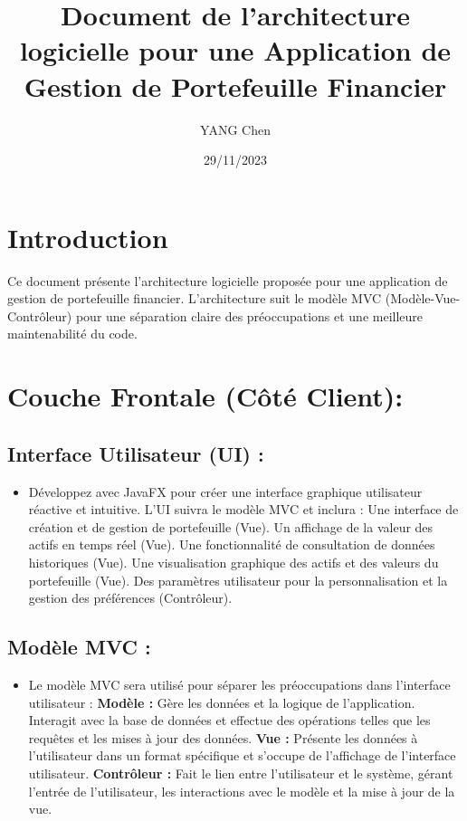 \documentclass{article}
\title{Document de l'architecture logicielle pour une Application de Gestion de Portefeuille Financier}
\date{29/11/2023}
\author{YANG Chen}
\begin{document}
\maketitle

\section{Introduction}
Ce document présente l'architecture logicielle proposée pour une application de gestion de portefeuille financier. L'architecture suit le modèle MVC (Modèle-Vue-Contrôleur) pour une séparation claire des préoccupations et une meilleure maintenabilité du code.

\section{Couche Frontale (Côté Client):}
\subsection{Interface Utilisateur (UI) :}
\begin{itemize}
  \item Développez avec JavaFX pour créer une interface graphique utilisateur réactive et intuitive. L'UI suivra le modèle MVC et inclura :
  \subitem Une interface de création et de gestion de portefeuille (Vue).
  \subitem Un affichage de la valeur des actifs en temps réel (Vue).
  \subitem Une fonctionnalité de consultation de données historiques (Vue).
  \subitem Une visualisation graphique des actifs et des valeurs du portefeuille (Vue).
  \subitem Des paramètres utilisateur pour la personnalisation et la gestion des préférences (Contrôleur).
\end{itemize}
\subsection{Modèle MVC :}
\begin{itemize}
  \item Le modèle MVC sera utilisé pour séparer les préoccupations dans l'interface utilisateur :
  \subitem \textbf{Modèle :} Gère les données et la logique de l'application. Interagit avec la base de données et effectue des opérations telles que les requêtes et les mises à jour des données.
  \subitem \textbf{Vue :} Présente les données à l'utilisateur dans un format spécifique et s'occupe de l'affichage de l'interface utilisateur.
  \subitem \textbf{Contrôleur :} Fait le lien entre l'utilisateur et le système, gérant l'entrée de l'utilisateur, les interactions avec le modèle et la mise à jour de la vue.
\end{itemize}
\end{document}
